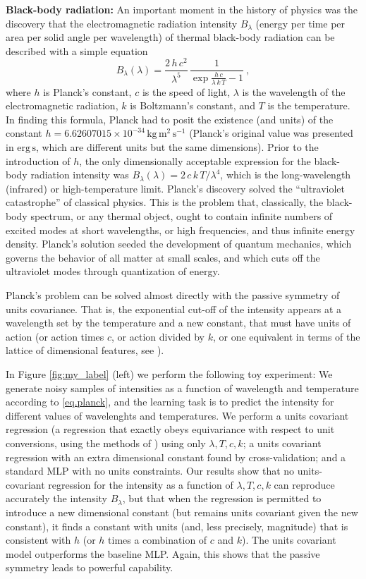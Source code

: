 \documentclass{article}
\theoremstyle{plain}
\theoremstyle{definition}
\theoremstyle{remark}
\newcommand{\unit}[1]{\mathrm{#1}}
\newcommand{\kg}{\unit{kg}}
\newcommand{\m}{\unit{m}}
\newcommand{\s}{\unit{s}}
\begin{document}
\textbf{Black-body radiation:}
An important moment in the history of physics was the discovery that the electromagnetic radiation intensity $B_\lambda$ (energy per time per area per solid angle per wavelength) of thermal black-body radiation can be described with a simple equation \cite{planck}
\begin{equation} \label{eq.planck}
    B_\lambda(\lambda) = \frac{2\,h\,c^2}{\lambda^5}\,\frac{1}{\exp\frac{h\,c}{\lambda\,k\,T} - 1}~,
\end{equation}
where $h$ is Planck's constant,
$c$ is the speed of light,
$\lambda$ is the wavelength of the electromagnetic radiation,
$k$ is Boltzmann's constant,
and $T$ is the temperature.
In finding this formula, Planck had to posit the existence (and units) of the constant $h=6.62607015\times 10^{-34}\,\kg\,\m^2\,\s^{-1}$ (Planck's original value was presented in $\mathrm{erg}\,\s$, which are different units but the same dimensions).
Prior to the introduction of $h$, the only dimensionally acceptable expression for the black-body radiation intensity was $B_\lambda(\lambda)=2\,c\,k\,T/\lambda^4$, which is the long-wavelength (infrared) or high-temperature limit.
Planck's discovery solved the ``ultraviolet catastrophe'' of classical physics.
This is the problem that, classically, the black-body spectrum, or any thermal object, ought to contain infinite numbers of excited modes at short wavelengths, or high frequencies, and thus infinite energy density.
Planck's solution seeded the development of quantum mechanics, which governs the behavior of all matter at small scales, and which cuts off the ultraviolet modes through quantization of energy.

Planck's problem can be solved almost directly with the passive symmetry of units covariance.
That is, the exponential cut-off of the intensity appears at a wavelength set by the temperature and a new constant, that must have units of action (or action times $c$, or action divided by $k$, or one equivalent in terms of the lattice of dimensional features, see \cite{villar2022dimensionless}).

In Figure \ref{fig:my_label} (left) we perform the following toy experiment:
We generate noisy samples of intensities as a function of wavelength and temperature according to \eqref{eq.planck}, and the learning task is to predict the intensity for different values of wavelenghts and temperatures.
We perform a units covariant regression (a regression that exactly obeys equivariance with respect to unit conversions, using the methods of \citealt{villar2022dimensionless}) using only $\lambda, T, c, k$; a units covariant regression with an extra dimensional constant found by cross-validation; and a standard MLP with no units constraints.
Our results show that no units-covariant regression for the intensity as a function of $\lambda, T, c, k$ can reproduce accurately the intensity $B_\lambda$, but that when the regression is permitted to introduce a new dimensional constant (but remains units covariant given the new constant), it finds a constant with units (and, less precisely, magnitude) that is consistent with $h$ (or $h$ times a combination of $c$ and $k$). The units covariant model outperforms the baseline MLP. Again, this shows that the passive symmetry leads to powerful capability.
\end{document}
